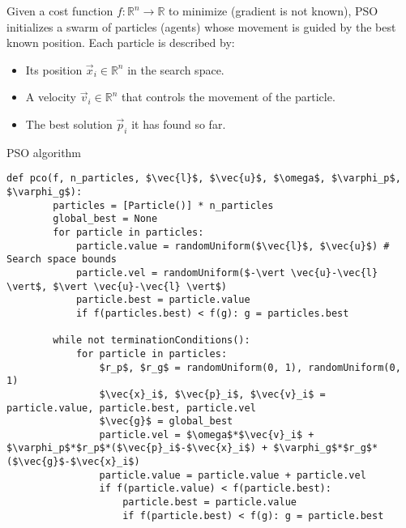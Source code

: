 Given a cost function $f: \mathbb{R}^n \rightarrow \mathbb{R}$ to minimize (gradient is not known),
PSO initializes a swarm of particles (agents) whose movement is guided by the best known position.
Each particle is described by:
\begin{itemize}
    \item Its position $\vec{x}_i \in \mathbb{R}^n$ in the search space.
    \item A velocity $\vec{v}_i \in \mathbb{R}^n$ that controls the movement of the particle.
    \item The best solution $\vec{p}_i$ it has found so far.
\end{itemize}

\begin{algorithm}
\caption{PSO algorithm}
\begin{lstlisting}[mathescape=true]
    def pco(f, n_particles, $\vec{l}$, $\vec{u}$, $\omega$, $\varphi_p$, $\varphi_g$):
        particles = [Particle()] * n_particles
        global_best = None
        for particle in particles:
            particle.value = randomUniform($\vec{l}$, $\vec{u}$) # Search space bounds
            particle.vel = randomUniform($-\vert \vec{u}-\vec{l} \vert$, $\vert \vec{u}-\vec{l} \vert$)
            particle.best = particle.value
            if f(particles.best) < f(g): g = particles.best

        while not terminationConditions():
            for particle in particles:
                $r_p$, $r_g$ = randomUniform(0, 1), randomUniform(0, 1)
                $\vec{x}_i$, $\vec{p}_i$, $\vec{v}_i$ = particle.value, particle.best, particle.vel
                $\vec{g}$ = global_best
                particle.vel = $\omega$*$\vec{v}_i$ + $\varphi_p$*$r_p$*($\vec{p}_i$-$\vec{x}_i$) + $\varphi_g$*$r_g$*($\vec{g}$-$\vec{x}_i$)
                particle.value = particle.value + particle.vel
                if f(particle.value) < f(particle.best):
                    particle.best = particle.value
                    if f(particle.best) < f(g): g = particle.best
\end{lstlisting}
\end{algorithm}

